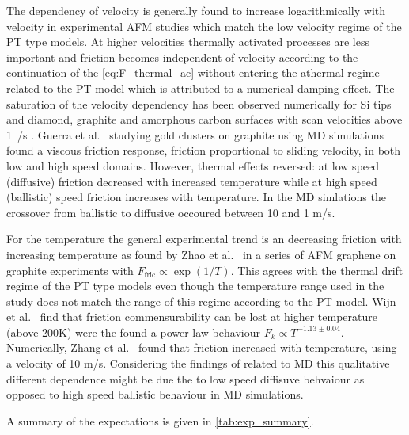 The dependency of velocity is generally found to increase logarithmically with
velocity in experimental \acrshort{AFM} studies \cite[p. 201]{gnecco_meyer_2015}
which match the low velocity regime of the \acrshort{PT} type models. At higher
velocities thermally activated processes are less important and friction becomes
independent of velocity according to the continuation of the
\cref{eq:F_thermal_ac} without entering the athermal regime related to the
\acrshort{PT} model which is attributed to a numerical damping effect. The
saturation of the velocity dependency has been observed numerically for Si tips
and diamond, graphite and amorphous carbon surfaces with scan velocities above
\SI{1}{\mu/s} \cite{zworner1998velocity}. Guerra et al.\ \cite{Guerra_2010}
studying gold clusters on graphite using \acrshort{MD} simulations  found a
viscous friction response, friction proportional to sliding velocity,
in both low and high speed domains. However, thermal effects reversed: at low
speed (diffusive) friction decreased with increased temperature while at high
speed (ballistic) speed friction increases with temperature. In the
\acrshort{MD} simlations the crossover from ballistic to diffusive occoured
between 10 and 1 m/s. 

For the temperature the general experimental trend is an decreasing friction with increasing temperature as found by  Zhao et al.\ \cite{zhao_thermally_2007} in a series of \acrshort{AFM} graphene on graphite experiments with $F_{\text{fric}} \propto \exp{(1/T)}$. This agrees with the thermal drift regime of the \acrshort{PT} type models even though the temperature range used in the study does not match the range of this regime according to the \acrshort{PT} model. Wijn et al.\ \cite{Wijn_2011} find that friction commensurability can be lost at higher temperature (above 200K) were the found a power law behaviour $F_k \propto T^{-1.13 \pm0.04}$. Numerically, Zhang et al.\ \cite{ma12091425} found that friction increased with temperature, using a velocity of 10 m/s. Considering the findings of \cite{Guerra_2010} related to \acrshort{MD} this qualitative different dependence might be due the to low speed diffisuve behvaiour as opposed to high speed ballistic behaviour in \acrshort{MD} simulations. 

A summary of the expectations is given in \cref{tab:exp_summary}.

